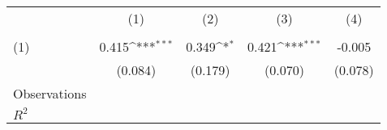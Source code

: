 {
\def\sym#1{\ifmmode^{#1}\else\(^{#1}\)\fi}
\begin{tabular}{l*{4}{c}}
\hline\hline
                    &\multicolumn{1}{c}{(1)}&\multicolumn{1}{c}{(2)}&\multicolumn{1}{c}{(3)}&\multicolumn{1}{c}{(4)}\\
                    &\multicolumn{1}{c}{} &\multicolumn{1}{c}{} &\multicolumn{1}{c}{} &\multicolumn{1}{c}{} \\
\hline
(1)                 &       0.415\sym{***}&       0.349\sym{*}  &       0.421\sym{***}&      -0.005         \\
                    &     (0.084)         &     (0.179)         &     (0.070)         &     (0.078)         \\
\hline
Observations        &                     &                     &                     &                     \\
\(R^{2}\)           &                     &                     &                     &                     \\
\hline\hline
\end{tabular}
}
